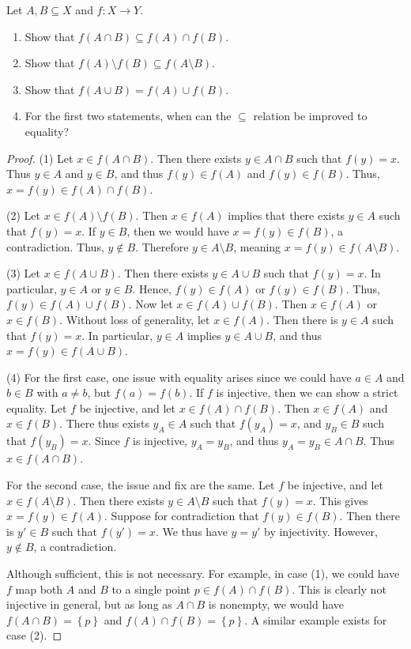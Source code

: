 \documentclass[11pt, letterpaper]{article}
\theoremstyle{definition}
\begin{document}
\begin{problem}[Exercise 3.4.3]\label{prob:1}
	Let $A,B\subseteq X$ and $f : X \to Y$.
	\begin{enumerate}[label=(\arabic*), align=right]
		\item Show that $f(A \cap B) \subseteq f(A) \cap f(B)$.
		\item Show that $f(A) \setminus f(B) \subseteq f(A\setminus B)$.
		\item Show that $f(A \cup B) = f(A)\cup f(B)$.
		\item For the first two statements, when can the $\subseteq $ relation be improved to equality?
	\end{enumerate}
\end{problem}
\begin{proof}
	(1) Let $x\in f(A \cap B)$. Then there exists $y\in A \cap B$ such that $f(y) = x$. Thus $y\in A$ and $y\in B$, and thus $f(y)\in f(A)$ and $f(y)\in f(B)$. Thus, $x=f(y) \in f(A) \cap f(B)$.

	(2) Let $x\in f(A) \setminus f(B)$. Then $x\in f(A)$ implies that there exists $y\in A$ such that $f(y)=x$. If $y\in B$, then we would have $x=f(y)\in f(B)$, a contradiction. Thus, $y\notin B$. Therefore $y\in A\setminus B$, meaning $x=f(y)\in f(A\setminus B)$.

	(3) Let $x\in f(A \cup B)$. Then there exists $y\in A \cup B$ such that $f(y) = x$. In particular, $y\in A$ or $y\in B$. Hence, $f(y)\in f(A)$ or $f(y)\in f(B)$. Thus, $f(y)\in f(A) \cup f(B)$. Now let $x\in f(A) \cup f(B)$. Then $x\in f(A)$ or $x\in f(B)$. Without loss of generality, let $x\in f(A)$. Then there is $y\in A$ such that $f(y)=x$. In particular, $y\in A$ implies $y\in A \cup B$, and thus $x=f(y)\in f(A \cup B)$.

	(4) For the first case, one issue with equality arises since we could have $a\in A$ and $b\in B$ with $a\neq b$, but $f(a)=f(b)$. If $f$ is injective, then we can show a strict equality. Let $f$ be injective, and let $x\in f(A) \cap f(B)$. Then $x\in f(A)$ and $x\in f(B)$. There thus exists $y_A\in A$ such that $f(y_A)=x$, and $y_B\in B$ such that $f(y_B)=x$. Since $f$ is injective, $y_A = y_B$, and thus $y_A=y_B\in A \cap B$. Thus $x\in f(A \cap B)$.

	For the second case, the issue and fix are the same. Let $f$ be injective, and let $x\in f(A \setminus B)$. Then there exists $y\in A \setminus B$ such that $f(y)=x$. This gives $x=f(y)\in f(A)$. Suppose for contradiction that $f(y)\in f(B)$. Then there is $y'\in B$ such that $f(y')=x$. We thus have $y=y'$ by injectivity. However, $y\notin B$, a contradiction.

	Although sufficient, this is not necessary. For example, in case (1), we could have $f$ map both $A$ and $B$ to a single point $p\in f(A) \cap f(B)$. This is clearly not injective in general, but as long as $A \cap B$ is nonempty, we would have $f(A \cap B)=\left\{ p \right\} $ and $f(A) \cap f(B) = \left\{ p \right\} $. A similar example exists for case (2).
\end{proof}
\end{document}
